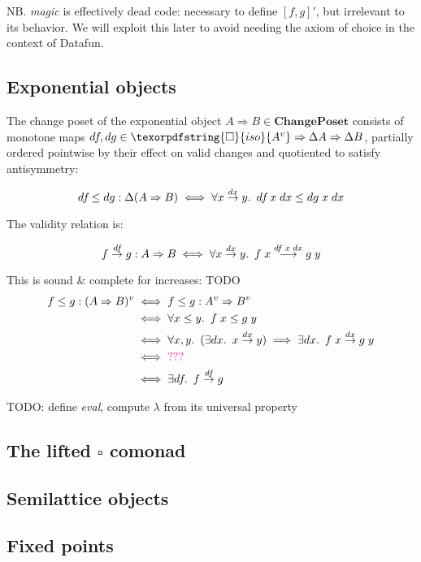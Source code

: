 \documentclass{rntz}
\newcommand\todo[1]{{\color{Rhodamine}#1}}
\newcommand\cat\textbf
\newcommand\CP{\cat{ChangePoset}}
\newcommand\D\Delta
\newcommand\iso{\texorpdfstring{\ensuremath{\square}}{iso}}
\newcommand\isof[1]{\iso {#1}}
\newcommand\fname[1]{\textit{#1}}
\newcommand\validarrow{{\to}}
\newcommand\longvalidarrow{{\longrightarrow}}
\newcommand\valid[1]{\mathrel{\overset{#1}{\validarrow}}}
\newcommand\longvalid[1]{\mathrel{\overset{#1}{\longvalidarrow}}}
\newcommand\vals[1]{#1^v} %
\newcommand\chgs[1]{\D{#1}}
\newcommand\deriv[1]{#1'}
\newcommand\bindsp{~\,}
\newcommand\fa[1]{\forall #1.\bindsp}
\newcommand\ex[1]{\exists #1.\bindsp}
\begin{document}
\noindent
NB. \fname{magic} is effectively dead code: necessary to define $\deriv{[f,g]}$,
but irrelevant to its behavior. We will exploit this later to avoid needing the
axiom of choice in the context of Datafun.


\subsection{Exponential objects}

\newcommand\expO[2]{#1 \Rightarrow #2}
\newcommand\df{d\kern-0.1em f\kern-.1em} %

The change poset of the exponential object $\expO A B \in \CP$ consists of
monotone maps $\df, dg \in \expO{\isof{\vals A}}{\expO{\chgs A}{\chgs B}}$,
partially ordered pointwise by their effect on valid changes and quotiented to
satisfy antisymmetry:

\begin{equation*}
  \df \le dg : \chgs{(\expO A B)}
  \iff \fa{x \valid{dx} y} \df \;x \;dx \le dg \;x \;dx 
\end{equation*}

\noindent
The validity relation is:

\begin{equation*}
  f \valid{\df} g : \expO A B
  \iff \fa{x \valid{dx} y} f\;x \longvalid{df \;x \;dx} g\;y
\end{equation*}

\noindent
This is sound \& complete for increases: \todo{TODO}
\begin{align*}
  f \le g : \vals{(\expO A B)}
  &\iff f \le g : \expO{\vals A}{\vals B}\\
  &\iff \fa{x \le y} f\;x \le g\;y\\
  &\iff \fa{x,y} (\ex{dx} x \valid{dx} y)
  \implies \ex{dx} f\;x \valid{dx} g\;y\\
  &\iff \todo{???}\\
  &\iff \ex{\df} f \valid{\df} g
\end{align*}

\newcommand\fn\lambda
\todo{TODO: define \fname{eval}, compute $\fn$ from its universal property}


\subsection{The lifted \iso{} comonad}

\subsection{Semilattice objects}

\subsection{Fixed points}
\end{document}
